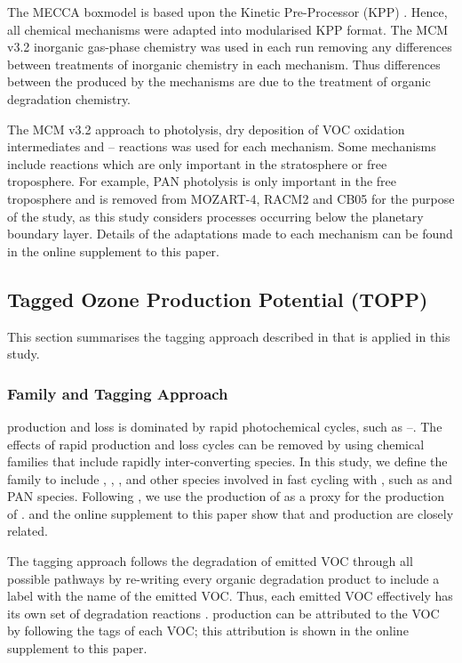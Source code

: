 The MECCA boxmodel is based upon the Kinetic Pre-Processor (KPP) \citep{Damian:2002}.
Hence, all chemical mechanisms were adapted into modularised KPP format.
The MCM v3.2 inorganic gas-phase chemistry was used in each run removing any differences between treatments of inorganic chemistry in each mechanism.
Thus differences between the  produced by the mechanisms are due to the treatment of organic degradation chemistry.

The MCM v3.2 approach to photolysis, dry deposition of VOC oxidation intermediates and -- reactions was used for each mechanism.
Some mechanisms include reactions which are only important in the stratosphere or free troposphere.
For example, PAN photolysis is only important in the free troposphere \citep{Harwood:2003} and is removed from MOZART-4, RACM2 and CB05 for the purpose of the study, as this study considers processes occurring below the planetary boundary layer.
Details of the adaptations made to each mechanism can be found in the online supplement to this paper.

\subsection{Tagged Ozone Production Potential (TOPP)}
This section summarises the tagging approach described in \citet{Butler:2011} that is applied in this study.

\subsubsection[Ox Family and Tagging Approach]{ Family and Tagging Approach} \label{ss:tagging} %
%
 production and loss is dominated by rapid photochemical cycles, such as --.
The effects of rapid production and loss cycles can be removed by using chemical families that include rapidly inter-converting species.
In this study, we define the  family to include , , ,  and other species involved in fast cycling with , such as  and PAN species.
Following \citet{Butler:2011}, we use the production of  as a proxy for the production of .
\citet{Butler:2011} and the online supplement to this paper show that  and  production are closely related.

The tagging approach follows the degradation of emitted VOC through all possible pathways by re-writing every organic degradation product to include a label with the name of the emitted VOC.
Thus, each emitted VOC effectively has its own set of degradation reactions \citep{Butler:2011}.
 production can be attributed to the VOC by following the tags of each VOC; this attribution is shown in the online supplement to this paper.


